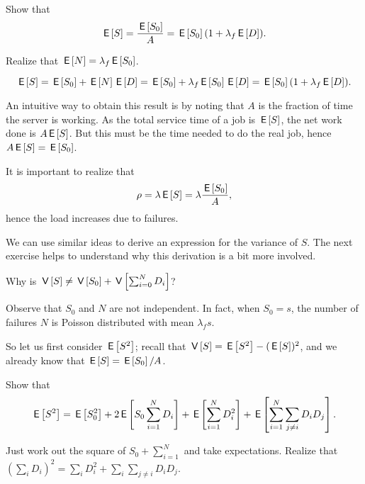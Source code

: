 \begin{exercise}[\faFlask]
  Show that 
  \begin{equation*}
\,\mathsf{E}\left[S\right] = \frac{\,\mathsf{E}\left[S_0\right]} A = \,\mathsf{E}\left[S_0\right] (1+\lambda_f \,\mathsf{E}\left[D\right]).
  \end{equation*}
  \begin{hint}
    Realize that $\,\mathsf{E}\left[N\right] = \lambda_f \,\mathsf{E}\left[S_0\right]$.
  \end{hint}
  \begin{solution}
    \begin{equation*}
      \,\mathsf{E}\left[S\right] = \,\mathsf{E}\left[S_0\right] + \,\mathsf{E}\left[N\right] \,\mathsf{E}\left[D\right] = \,\mathsf{E}\left[S_0\right] +  \lambda_f \,\mathsf{E}\left[S_0\right] \,\mathsf{E}\left[D\right]= \,\mathsf{E}\left[S_0\right](1+\lambda_f \,\mathsf{E}\left[D\right]).
    \end{equation*}
  \end{solution}
\end{exercise}
An intuitive way to obtain this result is by noting that $A$ is the fraction of time the server is working. As the total service time of a job is $\,\mathsf{E}\left[S\right]$, the net work done is $ A\,\mathsf{E}\left[S\right]$. But this must be the time needed to do the real job, hence $A \,\mathsf{E}\left[S\right] = \,\mathsf{E}\left[S_0\right]$.  

It is important to realize that 
\begin{equation*}
\rho = \lambda \,\mathsf{E}\left[S\right] = \lambda \frac{\,\mathsf{E}\left[S_0\right]}A,
\end{equation*}
hence the load increases due to failures. 


We can use similar ideas to derive an expression for the variance of $S$. The next exercise helps to  understand why this derivation is a bit more involved.
\begin{exercise}[\faFlask]
  Why is $\,\mathsf{V}\left[S\right] \neq \,\mathsf{V}\left[S_0\right] + \,\mathsf{V}\left[\sum_{i=0}^N D_i\right]$?
  \begin{solution}
    Observe that $S_0$ and $N$ are not independent. In fact, when $S_0=s$, the number of failures $N$ is Poisson distributed with mean $\lambda_f s$. 
  \end{solution}
\end{exercise}

So let us first consider $\,\mathsf{E}\left[S^2\right]$; recall that $\,\mathsf{V}\left[S\right] = \,\mathsf{E}\left[S^2\right] - (\,\mathsf{E}\left[S\right])^2$, and we already know that $\,\mathsf{E}\left[S\right] = \,\mathsf{E}\left[S_0\right]/A$. 

\begin{exercise}[\faFlask]
Show that 
\begin{equation*}
  \,\mathsf{E}\left[S^2\right] = \,\mathsf{E}\left[S_0^2\right] + 2\,\mathsf{E}\left[S_0 \sum_{i=1}^N D_i\right] + \,\mathsf{E}\left[\sum_{i=1}^N D_i^2\right] + \,\mathsf{E}\left[\sum_{i=1}^N \sum_{j\neq i} D_i D_j\right].
\end{equation*}
\begin{solution}
  Just work out the square of $S_0+\sum_{i=1}^N$ and take expectations. Realize that $(\sum_i D_i)^2 = \sum_i D_i^2 + \sum_i\sum_{j\neq i} D_i D_j$.  
\end{solution}
\end{exercise}

